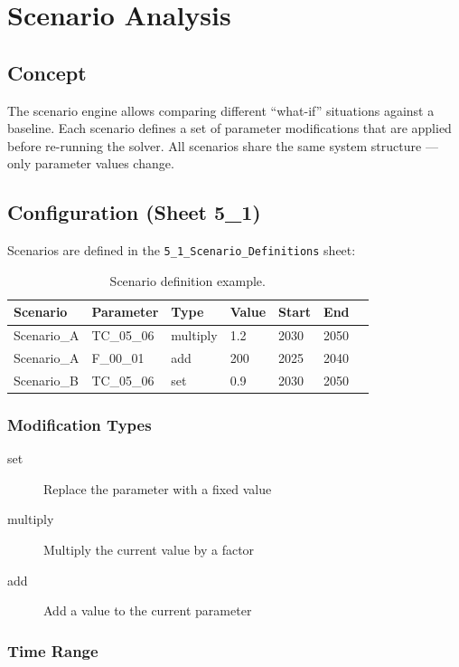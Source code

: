 \chapter{Scenario Analysis}
\label{ch:scenarios}

\section{Concept}

The scenario engine allows comparing different ``what-if'' situations against a baseline. Each scenario defines a set of parameter modifications that are applied before re-running the solver. All scenarios share the same system structure --- only parameter values change.

\section{Configuration (Sheet 5\_1)}

Scenarios are defined in the \texttt{5\_1\_Scenario\_Definitions} sheet:

\begin{table}[h]
\centering
\small
\begin{tabular}{lllllll}
\toprule
\textbf{Scenario} & \textbf{Parameter} & \textbf{Type} & \textbf{Value} & \textbf{Start} & \textbf{End} \\
\midrule
Scenario\_A & TC\_05\_06 & multiply & 1.2 & 2030 & 2050 \\
Scenario\_A & F\_00\_01 & add & 200 & 2025 & 2040 \\
Scenario\_B & TC\_05\_06 & set & 0.9 & 2030 & 2050 \\
\bottomrule
\end{tabular}
\caption{Scenario definition example.}
\end{table}

\subsection{Modification Types}

\begin{description}
  \item[set] Replace the parameter with a fixed value
  \item[multiply] Multiply the current value by a factor
  \item[add] Add a value to the current parameter
\end{description}

\subsection{Time Range}

